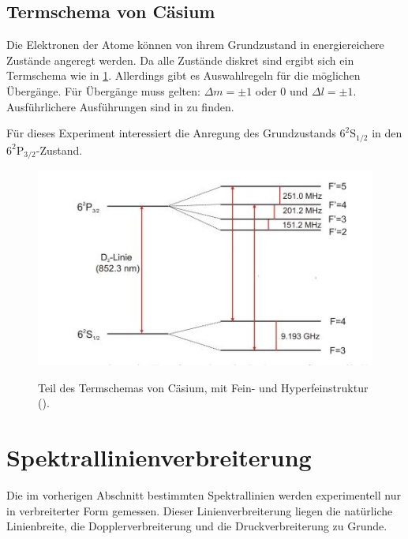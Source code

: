 \documentclass[../bericht.tex]{subfiles}
\begin{document}
      \subsection{Termschema von Cäsium}
      \label{subsec:termschema-caesium}

        Die Elektronen der Atome können von ihrem Grundzustand in energiereichere Zustände angeregt werden. Da alle Zustände diskret sind ergibt sich ein Termschema wie in \cref{fig:termschema}. Allerdings gibt es Auswahlregeln für die möglichen Übergänge. Für Übergänge muss gelten: $\Delta m= \pm 1$ oder 0 und $\Delta l=\pm 1$. Ausführlichere Ausführungen sind in \cite{grif:quanten} zu finden.

        Für dieses Experiment interessiert die Anregung des Grundzustands $6^2\mathrm{S}_{1/2}$ in den $6^2\mathrm{P}_{3/2}$-Zustand.
        \begin{figure}[tb]
          \begin{center}
            \fbox
            {
            \includegraphics[angle=0, height=8 cm]{figures/fein-hyp.JPG}
            }
            \caption{Teil des Termschemas von Cäsium, mit Fein- und Hyperfeinstruktur (\cite{fein-hyp}). }
          \end{center}
          \label{fig:termschema}
        \end{figure}




    \section{Spektrallinienverbreiterung}
    \label{sec:linienverbreiterung}

      Die im vorherigen Abschnitt bestimmten Spektrallinien werden experimentell nur in verbreiterter Form gemessen. Dieser Linienverbreiterung liegen die natürliche Linienbreite, die Dopplerverbreiterung und die Druckverbreiterung zu Grunde.
\end{document}
